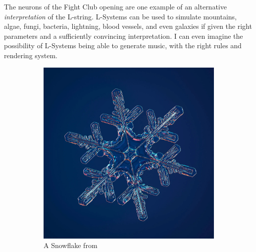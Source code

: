 \documentclass[12pt,twoside]{reedthesis}
\begin{document}
	
	The neurons of the Fight Club opening are one example of an alternative \textit{interpretation} of the L-string. L-Systems can be used to simulate mountains, algae, fungi, bacteria, lightning, blood vessels, and even galaxies if given the right parameters and a sufficiently convincing interpretation. I can even imagine the possibility of L-Systems being able to generate music, with the right rules and rendering system.
	
	
	\begin{figure}[h]
	\centering
	\begin{subfigure}{0.44\linewidth}
		\centering
		\includegraphics[width=\linewidth]{Images/Snowflake}
		\caption{A Snowflake from \cite{myhrvold2021}}
		\label{Snowflake}
	\end{subfigure}%
	\hfill
	\begin{subfigure}{0.52\linewidth}
		\centering

\end{subfigure}
\end{figure}
\end{document}
